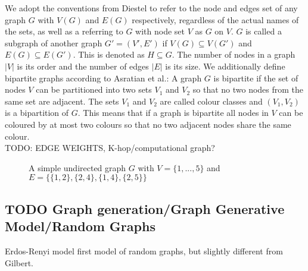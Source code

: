 We adopt the conventions from Diestel\cite{Diestel2017} to refer to the node and edges set of any graph $G$ with $V(G)$ and $E(G)$ respectively, regardless of the actual names of the sets, as well as a referring to $G$ with node set $V$ as $G$ on $V$. $G$ is called a subgraph of another graph $G'=(V',E')$ if $V(G) \subseteq V(G')$ and $E(G) \subseteq E(G')$. This is denoted as $H \subseteq G$. The number of nodes in a graph $|V|$ is its order and the number of edges $|E|$ is its size.
We additionally define bipartite graphs according to Asratian et al.\cite{asratian1998}: A graph $G$ is bipartite if the set of nodes $V$ can be partitioned into two sets $V_1$ and $V_2$ so that no two nodes from the same set are adjacent. The sets $V_1$ and $V_2$ are called colour classes and $(V_1, V_2)$ is a bipartition of $G$. This means that if a graph is bipartite all nodes in $V$ can be coloured by at most two colours so that no two adjacent nodes share the same colour.\\
TODO: EDGE WEIGHTS, K-hop/computational graph?
\begin{figure}[h]
    \centering
    \caption{A simple undirected graph $G$ with $V=\{1,...,5\}$ and $E=\{\{1,2\},\{2,4\},\{1,4\},\{2,5\}\}$}
    \label{fig:graph-example}
\end{figure}

\subsection{TODO Graph generation/Graph Generative Model/Random Graphs}
Erdos-Renyi model first model of random graphs, but slightly different from Gilbert. \bigskip

